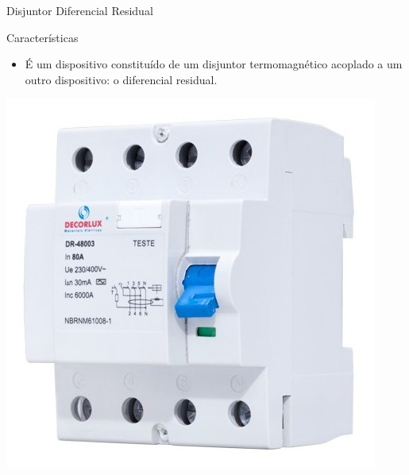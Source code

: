 %		
%


\begin{frame}{Disjuntor Diferencial Residual}
	\begin{block}{Características}

		\begin{itemize}
			\item É um dispositivo constituído de um disjuntor termomagnético acoplado a um outro dispositivo: o diferencial residual.
		\end{itemize}
	\end{block}

	\centering
	\includegraphics[width=0.4\linewidth]{Figuras/Ch04/fig10}
\end{frame}


